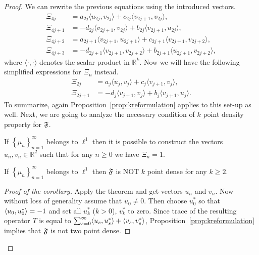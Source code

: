 \begin{proof}
      We can rewrite the previous equations using the introduced vectors.
      \begin{align*}
        \Xi_{4j} &= a_{2j} \langle u_{2j}, v_{2j}\rangle + c_{2j} \langle v_{2j+1}, v_{2j}\rangle,\\
        \Xi_{4j + 1} &= -d_{2j} \langle v_{2j+1}, v_{2j}\rangle + b_{2j} \langle v_{2j+1}, u_{2j}\rangle,\\
        \Xi_{4j + 2} &= a_{2j+1} \langle v_{2j+1}, u_{2j+1} \rangle + c_{2j+1} \langle v_{2j+1}, v_{2j+2} \rangle,\\
        \Xi_{4j + 3} &= -d_{2j+1} \langle v_{2j+1}, v_{2j+2}\rangle + b_{2j+1} \langle u_{2j+1}, v_{2j+2} \rangle,
      \end{align*}
        where $\langle\cdot, \cdot\rangle$ denotes the scalar product in $\mathbb{R}^k$.
      Now we will have the following simplified expressions for $\Xi_n$ instead.
      \begin{align*}
        \Xi_{2j} &= a_{j} \langle u_{j}, v_{j} \rangle  + c_{j} \langle v_{j+1}, v_{j} \rangle,\\
        \Xi_{2j + 1} &= -d_{j} \langle v_{j+1}, v_{j} \rangle + b_{j} \langle v_{j+1}, u_{j}\rangle.
      \end{align*}
      To summarize, again Proposition~\ref{prop:kreformulation} applies to this set-up as well.
      Next, we are going to analyze the necessary condition of $k$ point density property for $\mathfrak{F}$.
      \begin{prop}
        If $\left\{\mu_n\right\}_{n=1}^\infty$ belongs to $\ell^1$ then it is possible to construct
          the vectors $u_n, v_n \in \mathbb{R}^2$ such that for any $n \geq 0$ we have $\Xi_n = 1$.
      \end{prop}
      \begin{corol}
        \label{corol:2density}
        If $\left\{\mu_n\right\}_{n=1}^\infty$ belongs to $\ell^1$ then $\mathfrak{F}$ is NOT $k$ point dense for any $k \geq 2$.
      \end{corol}
      \begin{proof}[Proof of the corollary]
        Apply the theorem and get vectors $u_n$ and $v_n$.
        Now without loss of generality assume that $u_0 \neq 0$.
        Then choose $u^*_0$ so that $\langle u_0, u^*_0 \rangle = -1$ and set all $u^*_k$ ($k > 0$), $v^*_k$ to zero.
        Since trace of the resulting operator $T$ is equal to $\sum_{s=0}^\infty \langle u_s, u^*_s \rangle + \langle v_s, v^*_s \rangle$,
          Proposition~\ref{prop:kreformulation} implies that $\mathfrak{F}$ is not two point dense.

\end{proof}
\end{proof}
